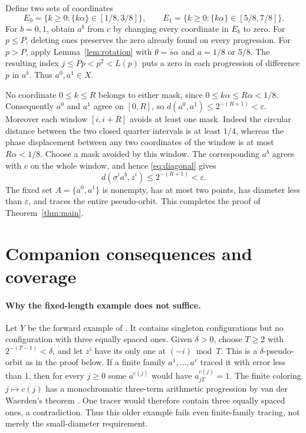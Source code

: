 \documentclass[11pt]{article}
\begin{document}
Define two sets of coordinates
\[
 E_0=\{k\geq0:\{k\alpha\}\in[1/8,3/8]\},\qquad
 E_1=\{k\geq0:\{k\alpha\}\in[5/8,7/8]\}.
\]
For $b=0,1$, obtain $a^b$ from $c$ by changing every coordinate
in $E_b$ to zero. For $p\leq P$, deleting ones preserves the zero
already found on every progression. For $p>P$, apply
Lemma~\ref{lem:rotation} with $\theta=s\alpha$ and $a=1/8$ or
$5/8$. The resulting index $j\leq Pp<p^2<L(p)$ puts a zero in
each progression of difference $p$ in $a^b$. Thus $a^0,a^1\in X$.

No coordinate $0\leq k\leq R$ belongs to either mask, since
$0\leq k\alpha\leq R\alpha<1/8$. Consequently $a^0$ and $a^1$
agree on $[0,R]$, so $d(a^0,a^1)\leq2^{-(R+1)}<\varepsilon$.
Moreover each window $[i,i+R]$ avoids at least one mask.
Indeed the circular distance between the two closed quarter intervals
is at least $1/4$, whereas the phase displacement between any two
coordinates of the window is at most $R\alpha<1/8$.
Choose a mask avoided by this window. The corresponding $a^b$ agrees
with $c$ on the whole window, and hence \eqref{eq:diagonal} gives
\[
 d(\sigma^i a^b,z^i)\leq2^{-(R+1)}<\varepsilon.
\]
The fixed set $A=\{a^0,a^1\}$ is nonempty, has at most two points,
has diameter less than $\varepsilon$, and traces the entire
pseudo-orbit. This completes the proof of Theorem~\ref{thm:main}.

\section{Companion consequences and coverage}
\paragraph{Why the fixed-length example does not suffice.}
Let $Y$ be the forward example of \cite[Proposition 4.17]{KLOY}.
It contains singleton configurations but no configuration with
three equally spaced ones. Given $\delta>0$, choose $T\geq2$
with $2^{-(T-1)}<\delta$, and let $z^i$ have its only one at
$(-i)\bmod T$. This is a $\delta$-pseudo-orbit as in the proof
below. If a finite family $a^1,\ldots,a^r$ traced it with error
less than $1$, then for every $j\geq0$ some $a^{c(j)}$ would
have $a^{c(j)}_{jT}=1$. The finite coloring $j\mapsto c(j)$ has
a monochromatic three-term arithmetic progression by van der
Waerden's theorem \cite[Introduction]{KLOY}. One tracer would
therefore contain three equally spaced ones, a contradiction.
Thus this older example fails even finite-family tracing, not
merely the small-diameter requirement.
\end{document}
